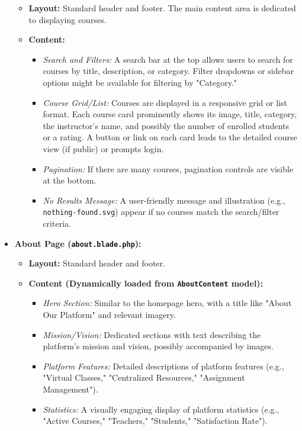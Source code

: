 \documentclass[12pt,a4paper]{article}
\begin{document}
\begin{itemize}
    \begin{itemize}
        \item \textbf{Layout:} Standard header and footer. The main content area is dedicated to displaying courses.
        \item \textbf{Content:}
        \begin{itemize}
            \item \textit{Search and Filters:} A search bar at the top allows users to search for courses by title, description, or category. Filter dropdowns or sidebar options might be available for filtering by "Category."
            \item \textit{Course Grid/List:} Courses are displayed in a responsive grid or list format. Each course card prominently shows its image, title, category, the instructor's name, and possibly the number of enrolled students or a rating. A button or link on each card leads to the detailed course view (if public) or prompts login.
            \item \textit{Pagination:} If there are many courses, pagination controls are visible at the bottom.
            \item \textit{No Results Message:} A user-friendly message and illustration (e.g., \texttt{nothing-found.svg}) appear if no courses match the search/filter criteria.
        \end{itemize}
    \end{itemize}
    \item \textbf{About Page (\texttt{about.blade.php}):}
    \begin{itemize}
        \item \textbf{Layout:} Standard header and footer.
        \item \textbf{Content (Dynamically loaded from \texttt{AboutContent} model):}
        \begin{itemize}
            \item \textit{Hero Section:} Similar to the homepage hero, with a title like "About Our Platform" and relevant imagery.
            \item \textit{Mission/Vision:} Dedicated sections with text describing the platform's mission and vision, possibly accompanied by images.
            \item \textit{Platform Features:} Detailed descriptions of platform features (e.g., "Virtual Classes," "Centralized Resources," "Assignment Management").
            \item \textit{Statistics:} A visually engaging display of platform statistics (e.g., "Active Courses," "Teachers," "Students," "Satisfaction Rate").

\end{itemize}
\end{itemize}
\end{itemize}
\end{document}
